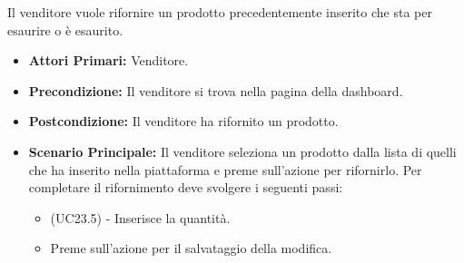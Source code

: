 Il venditore vuole rifornire un prodotto precedentemente inserito che sta per esaurire o è esaurito.
\begin{itemize}
    \item \textbf{Attori Primari:} Venditore.
    \item \textbf{Precondizione:} Il venditore si trova nella pagina della dashboard.
    \item \textbf{Postcondizione:} Il venditore ha rifornito un prodotto.
    \item \textbf{Scenario Principale:} Il venditore seleziona un prodotto dalla lista di quelli che ha inserito nella piattaforma e preme sull'azione per rifornirlo. Per completare il rifornimento deve svolgere i seguenti passi:
    \begin{itemize}
        \item (UC23.5) - Inserisce la quantità.
        \item Preme sull'azione per il salvataggio della modifica.
    \end{itemize}
\end{itemize}
